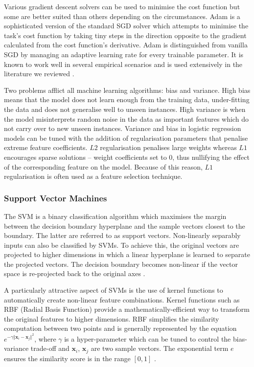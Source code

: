 Various gradient descent solvers can be used to minimise the cost function but some are better suited than others depending on the circumstances.  Adam \citep{kingma2014adam} is a sophisticated version of the standard \ac{SGD} solver which attempts to minimise the task’s cost function by taking tiny steps in the direction opposite to the gradient calculated from the cost function’s derivative.  Adam is distinguished from vanilla \ac{SGD} by managing an adaptive learning rate for every trainable parameter.  It is known to work well in several empirical scenarios and is used extensively in the literature we reviewed \citep{shwartz2016path, bernier2018crim, yamane2016distributional, espinosa2016supervised}.

Two problems afflict all machine learning algorithms: bias and variance.  High bias means that the model does not learn enough from the training data, under-fitting the data and does not generalise well to unseen instances.   High variance is when the model misinterprets random noise in the data as important features which do not carry over to new unseen instances.  Variance and bias in logistic regression models can be tuned with the addition of regularisation parameters that penalise extreme feature coefficients. $L2$ regularisation penalises large weights whereas $L1$ encourages sparse solutions – weight coefficients set to $0$, thus nullifying the effect of the corresponding feature on the model.  Because of this reason, $L1$ regularisation is often used as a feature selection technique.

\subsubsection{Support Vector Machines}
The \ac{SVM} is a binary classification algorithm which maximises the margin between the decision boundary hyperplane and the sample vectors closest to the boundary.  The latter are referred to as support vectors. Non-linearly separably inputs can also be classified by \ac{SVM}s.  To achieve this, the original vectors are projected to higher dimensions in which a linear hyperplane is learned to separate the projected vectors.  The decision boundary becomes non-linear if the vector space is re-projected back to the original axes \citep{raschka2017python}.

A particularly attractive aspect of \ac{SVM}s is the use of kernel functions to automatically create non-linear feature combinations.  Kernel functions such as RBF (Radial Basis Function) provide a mathematically-efficient way to transform the original features to higher dimensions.  RBF simplifies the similarity computation between two points and is generally represented by the equation $e^{-\gamma \Vert\bm{x}_i - \bm{x}_j \Vert^2}$, where $\gamma$ is a hyper-parameter which can be tuned to control the bias-variance trade-off and $\bm{x}_i$, $\bm{x}_j$ are two sample vectors.  The exponential term $e$ ensures the similarity score is in the range $[0, 1]$ \citep{raschka2017python}.

